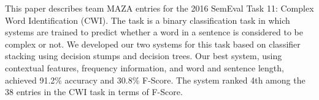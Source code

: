 This paper describes team MAZA entries for the 2016 SemEval Task 11: Complex Word Identification (CWI). The task is a binary classification task in which systems are trained to predict whether a word in a sentence is considered to be complex or not. We developed our two systems for this task based on classifier stacking using decision stumps and decision trees. Our best system, using contextual features, frequency information, and word and sentence length, achieved 91.2\% accuracy and 30.8\% F-Score. The system ranked 4th among the 38 entries in the CWI task in terms of F-Score.

